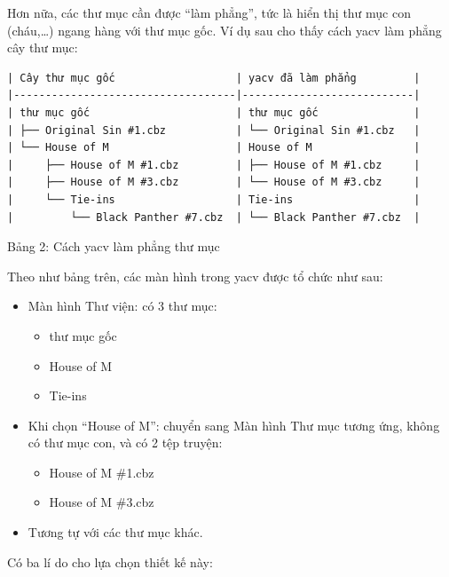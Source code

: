 \documentclass[
]{article}
\providecommand{\tightlist}{%
  \setlength{\itemsep}{0pt}\setlength{\parskip}{0pt}}
\begin{document}
Hơn nữa, các thư mục cần được ``làm phẳng'', tức là hiển thị thư mục con
(cháu,\ldots) ngang hàng với thư mục gốc. Ví dụ sau cho thấy cách yacv
làm phẳng cây thư mục:

\begin{verbatim}
| Cây thư mục gốc                   | yacv đã làm phẳng         |
|-----------------------------------|---------------------------|
| thư mục gốc                       | thư mục gốc               |
| ├── Original Sin #1.cbz           | └── Original Sin #1.cbz   |
| └── House of M                    | House of M                |
|     ├── House of M #1.cbz         | ├── House of M #1.cbz     |
|     ├── House of M #3.cbz         | └── House of M #3.cbz     |
|     └── Tie-ins                   | Tie-ins                   |
|         └── Black Panther #7.cbz  | └── Black Panther #7.cbz  |
\end{verbatim}

Bảng 2: Cách yacv làm phẳng thư mục

Theo như bảng trên, các màn hình trong yacv được tổ chức như sau:

\begin{itemize}
\item
  Màn hình Thư viện: có 3 thư mục:

  \begin{itemize}
  \tightlist
  \item
    thư mục gốc
  \item
    House of M
  \item
    Tie-ins
  \end{itemize}
\item
  Khi chọn ``House of M'': chuyển sang Màn hình Thư mục tương ứng, không
  có thư mục con, và có 2 tệp truyện:

  \begin{itemize}
  \tightlist
  \item
    House of M \#1.cbz
  \item
    House of M \#3.cbz
  \end{itemize}
\item
  Tương tự với các thư mục khác.
\end{itemize}

Có ba lí do cho lựa chọn thiết kế này:
\end{document}
